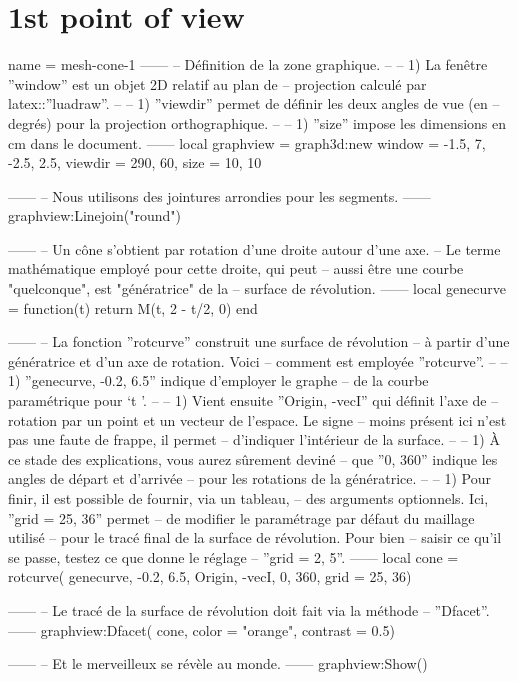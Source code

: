 \documentclass[varwidth, border = 3pt]{standalone}
\begin{document}
\section*{1st point of view}

\begin{luadraw}{name = mesh-cone-1}
------
-- Définition de la zone graphique.
--
--     1) La fenêtre ''window'' est un objet 2D relatif au plan de
--     projection calculé par latex::''luadraw''.
--
--     1) ''viewdir'' permet de définir les deux angles de vue (en
--     degrés) pour la projection orthographique.
--
--     1) ''size'' impose les dimensions en cm dans le document.
------
    local graphview = graph3d:new{
        window  = {-1.5, 7, -2.5, 2.5},
        viewdir = {290, 60},
        size    = {10, 10}
    }

------
-- Nous utilisons des jointures arrondies pour les segments.
------
    graphview:Linejoin("round")

------
-- Un cône s'obtient par rotation d'une droite autour d'une axe.
-- Le terme mathématique employé pour cette droite, qui peut
-- aussi être une courbe "quelconque", est "génératrice" de la
-- surface de révolution.
------
    local genecurve = function(t)
        return M(t, 2 - t/2, 0)
    end

------
-- La fonction ''rotcurve'' construit une surface de révolution
-- à partir d'une génératrice et d'un axe de rotation. Voici
-- comment est employée ''rotcurve''.
--
--     1) ''genecurve, -0.2, 6.5'' indique d'employer le graphe
--     de la courbe paramétrique pour `t \in [-0.2 .. 6.5]'.
--
--     1) Vient ensuite ''{Origin, -vecI}'' qui définit l'axe de
--     rotation par un point et un vecteur de l'espace. Le signe
--     moins présent ici n'est pas une faute de frappe, il permet
--     d'indiquer l'intérieur de la surface.
--
--     1) À ce stade des explications, vous aurez sûrement deviné
--     que ''0, 360'' indique les angles de départ et d'arrivée
--     pour les rotations de la génératrice.
--
--     1) Pour finir, il est possible de fournir, via un tableau,
--     des arguments optionnels. Ici, ''grid = {25, 36}'' permet
--     de modifier le paramétrage par défaut du maillage utilisé
--     pour le tracé final de la surface de révolution. Pour bien
--     saisir ce qu'il se passe, testez ce que donne le réglage
--     ''grid = {2, 5}''.
------
    local cone = rotcurve(
        genecurve, -0.2, 6.5,
        {Origin, -vecI},
        0, 360,
        {grid = {25, 36}})

------
-- Le tracé de la surface de révolution doit fait via la méthode
-- ''Dfacet''.
------
    graphview:Dfacet(
        cone,
        {color    = "orange",
         contrast = 0.5})

------
-- Et le merveilleux se révèle au monde.
------
    graphview:Show()
\end{luadraw}
\end{document}
